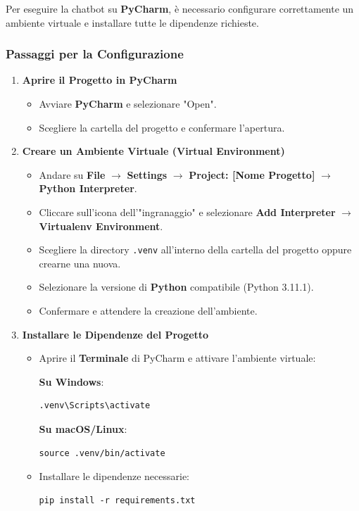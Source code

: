 \documentclass[12pt, letterpaper]{article}
\begin{document}
Per eseguire la chatbot su \textbf{PyCharm}, è necessario configurare correttamente un ambiente virtuale e installare tutte le dipendenze richieste.

\subsubsection{Passaggi per la Configurazione}

\begin{enumerate}
	\item \textbf{Aprire il Progetto in PyCharm}
	\begin{itemize}
		\item Avviare \textbf{PyCharm} e selezionare "Open".
		\item Scegliere la cartella del progetto e confermare l'apertura.
	\end{itemize}
	
	\item \textbf{Creare un Ambiente Virtuale (Virtual Environment)}
	\begin{itemize}
		\item Andare su \textbf{File} $\rightarrow$ \textbf{Settings} $\rightarrow$ \textbf{Project: [Nome Progetto]} $\rightarrow$ \textbf{Python Interpreter}.
		\item Cliccare sull'icona dell'"ingranaggio" e selezionare \textbf{Add Interpreter} $\rightarrow$ \textbf{Virtualenv Environment}.
		\item Scegliere la directory \texttt{.venv} all'interno della cartella del progetto oppure crearne una nuova.
		\item Selezionare la versione di \textbf{Python} compatibile (Python 3.11.1).
		\item Confermare e attendere la creazione dell'ambiente.
	\end{itemize}
	
	\item \textbf{Installare le Dipendenze del Progetto}
	\begin{itemize}
		\item Aprire il \textbf{Terminale} di PyCharm e attivare l'ambiente virtuale:
		
		\textbf{Su Windows}:
	\begin{lstlisting}
.venv\Scripts\activate
		\end{lstlisting}
		
		\textbf{Su macOS/Linux}:
		\begin{lstlisting}
source .venv/bin/activate
		\end{lstlisting}
		
		\item Installare le dipendenze necessarie:
		\begin{lstlisting}
pip install -r requirements.txt
		\end{lstlisting}
		
	\end{itemize}
\end{enumerate}
\end{document}
